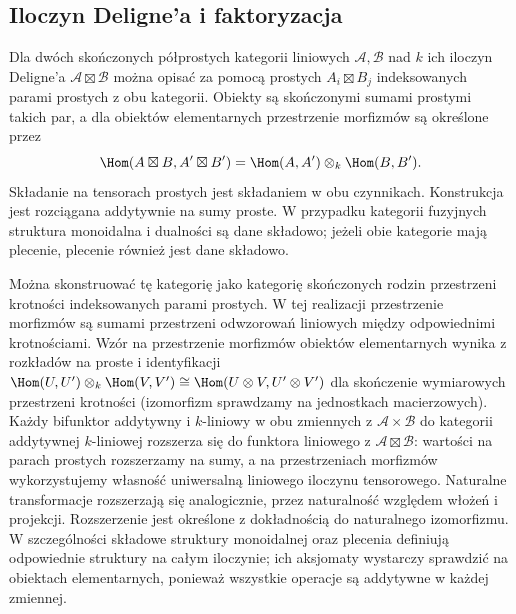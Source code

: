 \subsection{Iloczyn Deligne'a i faktoryzacja}

\begin{definicja}\label{cat:def:tf-deligne-product}
Dla dwóch skończonych półprostych kategorii liniowych $\mathcal A,\mathcal B$ nad $k$ ich iloczyn Deligne'a $\mathcal A\boxtimes\mathcal B$ można opisać za pomocą prostych $A_i\boxtimes B_j$ indeksowanych parami prostych z obu kategorii. Obiekty są skończonymi sumami prostymi takich par, a dla obiektów elementarnych przestrzenie morfizmów są określone przez
\[
 \Hom(A\boxtimes B,A'\boxtimes B')
 =\Hom(A,A')\otimes_k\Hom(B,B').
\]
Składanie na tensorach prostych jest składaniem w obu czynnikach. Konstrukcja jest rozciągana addytywnie na sumy proste. W przypadku kategorii fuzyjnych struktura monoidalna i dualności są dane składowo; jeżeli obie kategorie mają plecenie, plecenie również jest dane składowo.
\end{definicja}

Można skonstruować tę kategorię jako kategorię skończonych rodzin przestrzeni krotności indeksowanych parami prostych. W tej realizacji przestrzenie morfizmów są sumami przestrzeni odwzorowań liniowych między odpowiednimi krotnościami. Wzór na przestrzenie morfizmów obiektów elementarnych wynika z rozkładów na proste i identyfikacji $\Hom(U,U')\otimes_k\Hom(V,V')\cong\Hom(U\otimes V,U'\otimes V')$ dla skończenie wymiarowych przestrzeni krotności (izomorfizm sprawdzamy na jednostkach macierzowych). Każdy bifunktor addytywny i $k$-liniowy w obu zmiennych z $\mathcal A\times\mathcal B$ do kategorii addytywnej $k$-liniowej rozszerza się do funktora liniowego z $\mathcal A\boxtimes\mathcal B$: wartości na parach prostych rozszerzamy na sumy, a na przestrzeniach morfizmów wykorzystujemy własność uniwersalną liniowego iloczynu tensorowego. Naturalne transformacje rozszerzają się analogicznie, przez naturalność względem włożeń i projekcji. Rozszerzenie jest określone z dokładnością do naturalnego izomorfizmu. W szczególności składowe struktury monoidalnej oraz plecenia definiują odpowiednie struktury na całym iloczynie; ich aksjomaty wystarczy sprawdzić na obiektach elementarnych, ponieważ wszystkie operacje są addytywne w każdej zmiennej.

